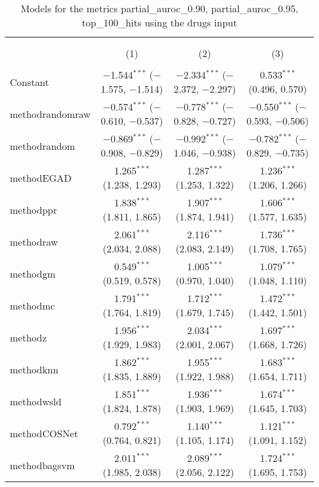 
\begin{table}[!htbp] \centering 
  \caption{Models for the metrics partial_auroc_0.90, partial_auroc_0.95, top_100_hits using the drugs input} 
  \label{} 
\begin{tabular}{@{\extracolsep{5pt}}lccc} 
\\[-1.8ex]\hline 
\hline \\[-1.8ex] 
\\[-1.8ex] & (1) & (2) & (3)\\ 
\hline \\[-1.8ex] 
 Constant & $-$1.544$^{***}$ ($-$1.575, $-$1.514) & $-$2.334$^{***}$ ($-$2.372, $-$2.297) & 0.533$^{***}$ (0.496, 0.570) \\ 
  methodrandomraw & $-$0.574$^{***}$ ($-$0.610, $-$0.537) & $-$0.778$^{***}$ ($-$0.828, $-$0.727) & $-$0.550$^{***}$ ($-$0.593, $-$0.506) \\ 
  methodrandom & $-$0.869$^{***}$ ($-$0.908, $-$0.829) & $-$0.992$^{***}$ ($-$1.046, $-$0.938) & $-$0.782$^{***}$ ($-$0.829, $-$0.735) \\ 
  methodEGAD & 1.265$^{***}$ (1.238, 1.293) & 1.287$^{***}$ (1.253, 1.322) & 1.236$^{***}$ (1.206, 1.266) \\ 
  methodppr & 1.838$^{***}$ (1.811, 1.865) & 1.907$^{***}$ (1.874, 1.941) & 1.606$^{***}$ (1.577, 1.635) \\ 
  methodraw & 2.061$^{***}$ (2.034, 2.088) & 2.116$^{***}$ (2.083, 2.149) & 1.736$^{***}$ (1.708, 1.765) \\ 
  methodgm & 0.549$^{***}$ (0.519, 0.578) & 1.005$^{***}$ (0.970, 1.040) & 1.079$^{***}$ (1.048, 1.110) \\ 
  methodmc & 1.791$^{***}$ (1.764, 1.819) & 1.712$^{***}$ (1.679, 1.745) & 1.472$^{***}$ (1.442, 1.501) \\ 
  methodz & 1.956$^{***}$ (1.929, 1.983) & 2.034$^{***}$ (2.001, 2.067) & 1.697$^{***}$ (1.668, 1.726) \\ 
  methodknn & 1.862$^{***}$ (1.835, 1.889) & 1.955$^{***}$ (1.922, 1.988) & 1.683$^{***}$ (1.654, 1.711) \\ 
  methodwsld & 1.851$^{***}$ (1.824, 1.878) & 1.936$^{***}$ (1.903, 1.969) & 1.674$^{***}$ (1.645, 1.703) \\ 
  methodCOSNet & 0.792$^{***}$ (0.764, 0.821) & 1.140$^{***}$ (1.105, 1.174) & 1.121$^{***}$ (1.091, 1.152) \\ 
  methodbagsvm & 2.011$^{***}$ (1.985, 2.038) & 2.089$^{***}$ (2.056, 2.122) & 1.724$^{***}$ (1.695, 1.753) \\ 

\end{tabular}
\end{table}
